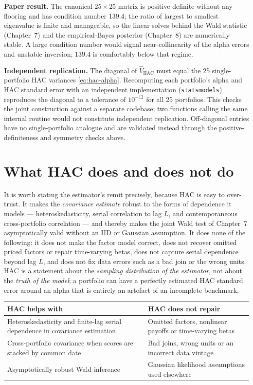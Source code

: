 \textbf{Paper result.} The canonical $25\times25$ matrix is positive
definite without any flooring and has condition number $139.4$; the ratio
of largest to smallest eigenvalue is finite and manageable, so the linear
solves behind the Wald statistic (Chapter~7) and the empirical-Bayes
posterior (Chapter~8) are numerically stable. A large condition number
would signal near-collinearity of the alpha errors and unstable inversion;
$139.4$ is comfortably below that regime.

\textbf{Independent replication.} The diagonal of $\hat V_{\mathrm{HAC}}$
must equal the 25 single-portfolio HAC variances \eqref{eq:hac-alpha}.
Recomputing each portfolio's alpha and HAC standard error with an
independent implementation (\texttt{statsmodels}) reproduces the diagonal
to a tolerance of $10^{-12}$ for all 25 portfolios. This checks the joint
construction against a separate codebase; two functions calling the same
internal routine would not constitute independent replication. Off-diagonal
entries have no single-portfolio analogue and are validated instead through
the positive-definiteness and symmetry checks above.

\hypertarget{what-hac-does-and-does-not-do}{%
\section{What HAC does and does not
do}\label{what-hac-does-and-does-not-do}}

It is worth stating the estimator's remit precisely, because HAC is easy to
over-trust. It makes the \emph{covariance estimate} robust to the forms of
dependence it models --- heteroskedasticity, serial correlation to lag $L$,
and contemporaneous cross-portfolio correlation --- and thereby makes the
joint Wald test of Chapter~7 asymptotically valid without an IID or
Gaussian assumption. It does none of the following: it does not make the
factor model correct, does not recover omitted priced factors or repair
time-varying betas, does not capture serial dependence beyond lag $L$, and
does not fix data errors such as a bad join or the wrong units. HAC is a
statement about the \emph{sampling distribution of the estimator}, not
about the \emph{truth of the model}; a portfolio can have a perfectly
estimated HAC standard error around an alpha that is entirely an artefact
of an incomplete benchmark.

\begin{longtable}[]{@{}p{}p{}@{}}
\toprule\noalign{}
HAC helps with & HAC does not repair \\
\midrule\noalign{}
\endhead
\bottomrule\noalign{}
\endlastfoot
Heteroskedasticity and finite-lag serial dependence in covariance
estimation & Omitted factors, nonlinear payoffs or time-varying betas \\
Cross-portfolio covariance when scores are stacked by common date & Bad
joins, wrong units or an incorrect data vintage \\
Asymptotically robust Wald inference & Gaussian likelihood assumptions
used elsewhere \\
\end{longtable}

